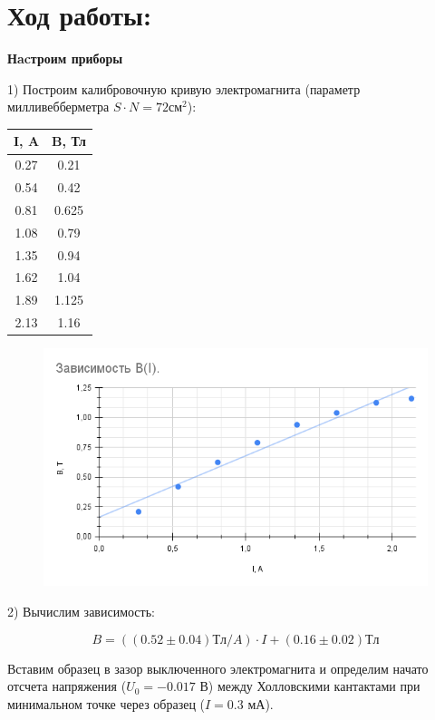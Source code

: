 \documentclass[11pt]{article}
\begin{document}
\section{Ход работы:}

\textbf{Нacтроим приборы}

1) Построим калибровочную кривую электромагнита (параметр милливебберметра \( S\cdot N = 72 см^2 \)): 

\begin{table}[H]
    \centering
    \begin{tabular}{|c|c|}
        \hline
        I, A  & B, Тл  \\\hline
        0.27  & 0.21  \\\hline
        0.54  & 0.42  \\\hline
        0.81  & 0.625 \\\hline
        1.08  & 0.79  \\\hline
        1.35  & 0.94  \\\hline
        1.62  & 1.04  \\\hline
        1.89  & 1.125 \\\hline
        2.13  & 1.16  \\\hline  
    \end{tabular}
\end{table}

\begin{figure} [H]
    \centering
    \includegraphics[width=\textwidth]{graf1.png}
\end{figure}

2) Вычислим зависимость:

\[ B = ((0.52 \pm 0.04) Тл/A) \cdot I + (0.16 \pm 0.02) Тл  \]

Вставим образец в зазор выключенного электромагнита и определим начато отсчета напряжения  (\( U_0 = -0.017 \) В) между Холловскими кантактами при минимальном точке через образец (\( I = 0.3 \) мА).
\end{document}
